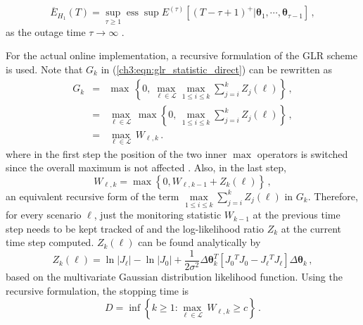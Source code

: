 \begin{equation}
\overline{E}_{H_1}(T)=\sup _{\tau \geq 1} \operatorname{ess} \sup E^{(\tau)}\left[(T-\tau+1)^{+} | \boldsymbol{\theta}_{1}, \cdots, \boldsymbol{\theta}_{\tau-1}\right] \,,
\end{equation} as the outage time $\tau \to \infty$ \cite{Lai1998}.

For the actual online implementation, a recursive formulation of the GLR scheme is used. Note that $G_k$ in (\ref{ch3:eqn:glr_statistic_direct}) can be rewritten as 
\begin{eqnarray}
G_k &=& \max \, \left\lbrace  0,  \, \underset{\ell \in \mathcal{L}}{\max} \underset{1\le i \le k}{\max} \sum_{j=i}^{k} Z_{j}(\ell)  \right\rbrace\,, \nonumber\\
    &=& \underset{\ell \in \mathcal{L}}{\max} \, \max \left\lbrace  0,  \, \underset{1\le i \le k}{\max} \sum_{j=i}^{k} Z_{j}(\ell)  \right\rbrace\,,\nonumber \\
    &=& \underset{\ell \in \mathcal{L}}{\max}  \,  W_{\ell, k} \,.
\end{eqnarray} 
where in the first step the position of the two inner $\max$ operators is switched since the overall maximum is not affected \cite{Mei2010}. Also, in the last step,
\begin{equation}
\label{ch3:eqn:glr_statistics}
W_{\ell, k} = \max \left\lbrace  0, W_{\ell, k-1} + Z_k(\ell) \right\rbrace \,,
\end{equation}
an equivalent recursive form of the term $\underset{1\le i \le k}{\max} \sum_{j=i}^{k} Z_{j}(\ell) $ in $G_k$. Therefore, for every scenario $\ell$, just the monitoring statistic $W_{k-1}$ at the previous time step needs to be kept tracked of and the log-likelihood ratio $Z_k$ at the current time step computed. $Z_k(\ell)$ can be found analytically by
\begin{equation}
\label{ch3:eqn:log_likelihood_explicit}
Z_k(\ell) = \ln\left| {J}_\ell \right| - \ln\left| {J}_0 \right| + \frac{1}{2\sigma^2} \Delta\boldsymbol{\theta}_k^{T} \left[ {J}_0{^T}  {J}_0 - {J}_\ell{^T} {J}_\ell \right] \Delta\boldsymbol{\theta}_k \,,
\end{equation} based on the multivariate Gaussian distribution likelihood function. Using the recursive formulation, the stopping time is
\begin{equation}
\label{ch3:eqn:stopping_rule}
    D = \inf \left\lbrace  k \ge 1: \underset{\ell \in \mathcal{L}}{\max} \, W_{\ell, k} \ge c \right\rbrace \,.
\end{equation}

